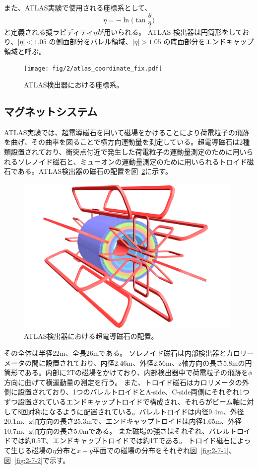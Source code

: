 また、ATLAS実験で使用される座標系として、
\begin{equation}
　\eta=-\ln\bigg(\tan\frac{\theta}{2}\bigg)
　\label{ラピディティ}
\end{equation}
と定義される擬ラピディティ$\eta$が用いられる。
ATLAS 検出器は円筒形をしており、$|\eta| < 1.05$ の側面部分をバレル領域、$|\eta| > 1.05$ の底面部分をエンドキャップ領域と呼ぶ。

\begin{figure}[tb]
  \centering
  \texttt{[image: fig/2/atlas\_coordinate\_fix.pdf]}
  \caption{ATLAS検出器における座標系。}
  \label{fig:2-5}
\end{figure}

\newpage
\subsection{マグネットシステム}\label{section2-2-2}
ATLAS実験では、超電導磁石を用いて磁場をかけることにより荷電粒子の飛跡を曲げ、その曲率を図ることで横方向運動量を測定している。超電導磁石は2種類設置されており、衝突点付近で発生した荷電粒子の運動量測定のために用いられるソレノイド磁石と、ミューオンの運動量測定のために用いられるトロイド磁石である。ATLAS検出器の磁石の配置を図~\ref{fig:2-6}に示す。

\begin{figure}[tb]
  \centering
  \includegraphics[clip, width=11cm]{fig/2/ATLcoilGeom.pdf}
  \caption{ATLAS検出器における超電導磁石の配置。}
  \label{fig:2-6}
\end{figure}

その全体は半径22m、全長26mである。
ソレノイド磁石は内部検出器とカロリーメータの間に設置されており、内径2.46m、外径2.56m、z軸方向の長さ5.8mの円筒形である。内部に2Tの磁場をかけており、内部検出器中で荷電粒子の飛跡を$\phi$方向に曲げて横運動量の測定を行う。
また、トロイド磁石はカロリメータの外側に設置されており、1つのバレルトロイドとA-side、C-side両側にそれぞれ1つずつ設置されているエンドキャップトロイドで構成され、それらがビーム軸に対して8回対称になるように配置されている。バレルトロイドは内径9.4m、外径20.1m、z軸方向の長さ25.3mで、エンドキャップトロイドは内径1.65m、外径10.7m、z軸方向の長さ5.0mである。
また磁場の強さはそれぞれ、バレルトロイドでは約0.5T、エンドキャップトロイドでは約1Tである。
トロイド磁石によって生じる磁場の$\eta$分布と$x-y$平面での磁場の分布をそれぞれ図~\ref{fig:2-7-1}、図~\ref{fig:2-7-2}で示す。

